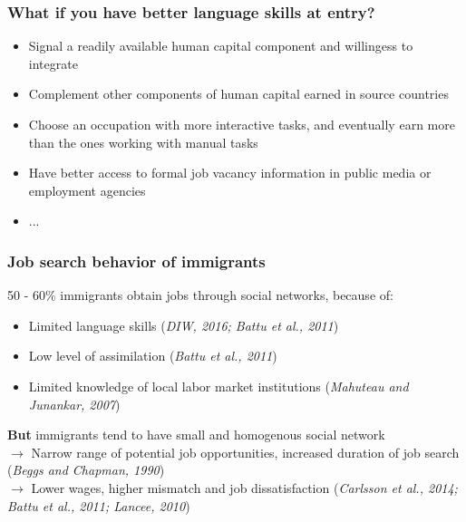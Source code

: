 \documentclass{beamer}
\begin{document}

\begin{frame}
\frametitle{What if you have better language skills at entry?}

\begin{itemize}
\item Signal a readily available human capital component and willingess to integrate
\item Complement other components of human capital earned in source countries 
\item Choose an occupation with more interactive tasks, and eventually earn more than the ones working with manual tasks
\item Have better access to formal job vacancy information in public media or employment agencies
\item ...
\end{itemize}

\end{frame}

\begin{frame}
\frametitle{Job search behavior of immigrants}
50 - 60\% immigrants obtain jobs through social networks, because of:

\begin{itemize}
\item Limited language skills (\textit{DIW, 2016; Battu et al., 2011})
\item Low level of assimilation (\textit{Battu et al., 2011})
\item Limited knowledge of local labor market institutions (\textit{Mahuteau and Junankar, 2007})
\end{itemize}

\textbf{But} immigrants tend to have small and homogenous social network \\
$\rightarrow$ Narrow range of potential job opportunities, increased duration of job search (\textit{Beggs and Chapman, 1990}) \\
$\rightarrow$ Lower wages, higher mismatch and job dissatisfaction (\textit{Carlsson et al., 2014; Battu et al., 2011; Lancee, 2010})

\end{frame}

\end{document}
